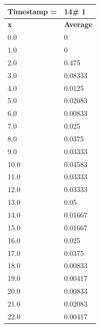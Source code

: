 \begin{tabular}{|l||l|}
\hline
\textbf{Timestamp =} & \textbf{14}\# 1\\\hline
	\textbf{x} & \textbf{Average} \\ \hline
\hline
	0.0 & 0 \\ \hline
	1.0 & 0 \\ \hline
	2.0 & 0.475 \\ \hline
	3.0 & 0.08333 \\ \hline
	4.0 & 0.0125 \\ \hline
	5.0 & 0.02083 \\ \hline
	6.0 & 0.00833 \\ \hline
	7.0 & 0.025 \\ \hline
	8.0 & 0.0375 \\ \hline
	9.0 & 0.03333 \\ \hline
	10.0 & 0.04583 \\ \hline
	11.0 & 0.03333 \\ \hline
	12.0 & 0.03333 \\ \hline
	13.0 & 0.05 \\ \hline
	14.0 & 0.01667 \\ \hline
	15.0 & 0.01667 \\ \hline
	16.0 & 0.025 \\ \hline
	17.0 & 0.0375 \\ \hline
	18.0 & 0.00833 \\ \hline
	19.0 & 0.00417 \\ \hline
	20.0 & 0.00833 \\ \hline
	21.0 & 0.02083 \\ \hline
	22.0 & 0.00417 \\ \hline
\end{tabular}
